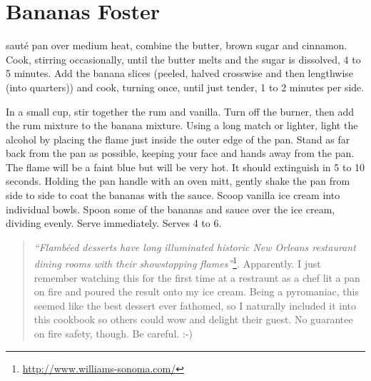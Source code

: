 \documentclass{tufte-book}
\begin{document}
\section{Bananas Foster}

 saut\'{e} pan over medium heat, combine the butter, brown sugar and cinnamon. Cook, stirring occasionally, until the butter melts and the sugar is dissolved, 4 to 5 minutes. Add the banana slices (peeled, halved crosswise and then lengthwise (into quarters)) and cook, turning once, until just tender, 1 to 2 minutes per side.

In a small cup, stir together the rum and vanilla. Turn off the burner, then add the rum mixture to the banana mixture. Using a long match or lighter, light the alcohol by placing the flame just inside the outer edge of the pan. Stand as far back from the pan as possible, keeping your face and hands away from the pan. The flame will be a faint blue but will be very hot. It should extinguish in 5 to 10 seconds. Holding the pan handle with an oven mitt, gently shake the pan from side to side to coat the bananas with the sauce.
Scoop vanilla ice cream into individual bowls. Spoon some of the bananas and sauce over the ice cream, dividing evenly. Serve immediately. Serves 4 to 6.

\begin{quote}
\emph{``Flamb\'{e}ed desserts have long illuminated historic New Orleans restaurant dining rooms with their showstopping flames''}\footnote{\url{http://www.williams-sonoma.com/}}. Apparently. I just remember watching this for the first time at a restraunt as a chef lit a pan on fire and poured the result onto my ice cream. Being a pyromaniac, this seemed like the best dessert ever fathomed, so I naturally included it into this cookbook so others could wow and delight their guest. No guarantee on fire safety, though. Be careful. :-)
\end{quote}
\end{document}
